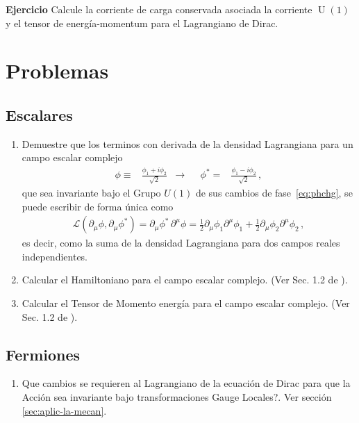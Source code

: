 \textbf{Ejercicio} Calcule la corriente de carga conservada asociada la corriente $\operatorname{U}(1)$ y el tensor de energía-momentum para el Lagrangiano de Dirac.



\section{Problemas}


\subsection{Escalares}

\begin{enumerate}
\item  Demuestre que los terminos con derivada de la densidad Lagrangiana para un campo escalar complejo
\begin{align}
  \phi\equiv&\frac{\phi_1+i\phi_2}{\sqrt{2}} &\to&&   \phi^{*}=&\frac{\phi_1-i\phi_2}{\sqrt{2}}\,,
\end{align}
que sea invariante bajo el Grupo $U(1)$ de sus cambios de fase~\eqref{eq:phchg}, se puede escribir de forma única como
\begin{align}
  \mathcal{L}(\partial_{\mu} \phi,\partial_{\mu} \phi^{*})=  {\partial_\mu\phi^{*}}\,{\partial^\mu\phi}=\frac{1}{2}\partial_{\mu}\phi_1 \partial^{\mu}\phi_1+\frac{1}{2}\partial_{\mu}\phi_2 \partial^{\mu}\phi_2\,,
\end{align}
es decir, como la suma de la densidad Lagrangiana para dos campos reales independientes.

  
\item Calcular el Hamiltoniano para el campo escalar complejo. (Ver Sec. 1.2 de \cite{Greiner:1990tz}).
  
\item Calcular el Tensor de Momento energía para el campo escalar complejo. (Ver Sec. 1.2 de \cite{Greiner:1990tz}).
\end{enumerate}


\subsection{Fermiones}


\begin{enumerate}
 \item \textquestiondown Que cambios se requieren al Lagrangiano de la ecuaci\'on de Dirac para que la Acci\'on sea invariante bajo transformaciones Gauge Locales?. Ver secci\'on \ref{sec:aplic-la-mecan}.


\label{item:pch1.3} %

\end{enumerate}

%
